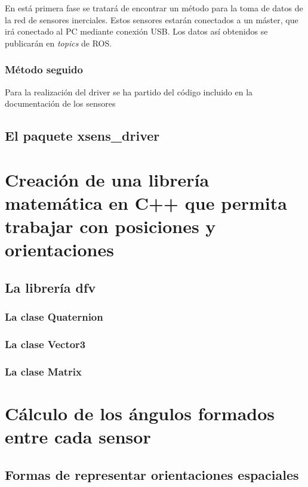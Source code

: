 \documentclass[10pt, a4paper]{report}
\begin{document}
En está primera fase se tratará de encontrar un método para la toma de datos de la red de sensores inerciales. Estos sensores estarán conectados a un máster, que irá conectado al PC mediante conexión USB. Los datos así obtenidos se publicarán en \textit{topics} de ROS.

\subsubsection{Método seguido}

Para la realización del driver se ha partido del código incluido en la documentación de los sensores

\subsection{El paquete xsens\_driver}



\section{Creación de una librería matemática en C++ que permita trabajar con posiciones y orientaciones}


\subsection{La librería dfv}

\subsubsection{La clase Quaternion}

\subsubsection{La clase Vector3}

\subsubsection{La clase Matrix}

\section{Cálculo de los ángulos formados entre cada sensor}

\subsection{Formas de representar orientaciones espaciales}
\end{document}
